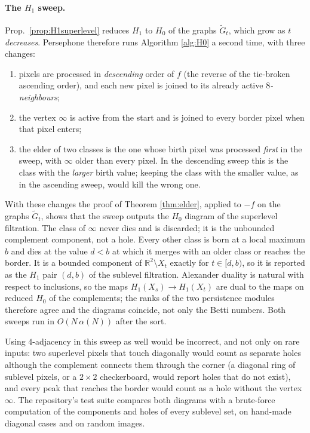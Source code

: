 \documentclass[11pt]{article}
\theoremstyle{persdef}
\newcommand{\R}{\mathbb{R}}
\newcommand{\X}{X}
\newcommand{\Hk}[1]{H_{#1}}
\begin{document}
\paragraph{The $H_1$ sweep.}
Prop.\ \ref{prop:H1superlevel} reduces $H_1$ to $H_0$ of the graphs $\widetilde{G}_t$, which grow as $t$ \emph{decreases}. Persephone therefore runs Algorithm \ref{alg:H0} a second time, with three changes:
\begin{enumerate}[leftmargin=2em,itemsep=0.2em]
  \item pixels are processed in \emph{descending} order of $f$ (the reverse of the tie-broken ascending order), and each new pixel is joined to its already active \emph{$8$-neighbours};
  \item the vertex $\infty$ is active from the start and is joined to every border pixel when that pixel enters;
  \item the elder of two classes is the one whose birth pixel was processed \emph{first} in the sweep, with $\infty$ older than every pixel. In the descending sweep this is the class with the \emph{larger} birth value; keeping the class with the smaller value, as in the ascending sweep, would kill the wrong one.
\end{enumerate}
With these changes the proof of Theorem \ref{thm:elder}, applied to $-f$ on the graphs $\widetilde{G}_t$, shows that the sweep outputs the $H_0$ diagram of the superlevel filtration. The class of $\infty$ never dies and is discarded; it is the unbounded complement component, not a hole. Every other class is born at a local maximum $b$ and dies at the value $d<b$ at which it merges with an older class or reaches the border. It is a bounded component of $\R^2\setminus\X_t$ exactly for $t\in[d,b)$, so it is reported as the $H_1$ pair $(d,b)$ of the sublevel filtration. Alexander duality is natural with respect to inclusions, so the maps $\Hk{1}(\X_s)\to\Hk{1}(\X_t)$ are dual to the maps on reduced $H_0$ of the complements; the ranks of the two persistence modules therefore agree and the diagrams coincide, not only the Betti numbers. Both sweeps run in $O(N\,\alpha(N))$ after the sort.

Using $4$-adjacency in this sweep as well would be incorrect, and not only on rare inputs: two superlevel pixels that touch diagonally would count as separate holes although the complement connects them through the corner (a diagonal ring of sublevel pixels, or a $2\times2$ checkerboard, would report holes that do not exist), and every peak that reaches the border would count as a hole without the vertex $\infty$. The repository's test suite compares both diagrams with a brute-force computation of the components and holes of every sublevel set, on hand-made diagonal cases and on random images.
\end{document}
